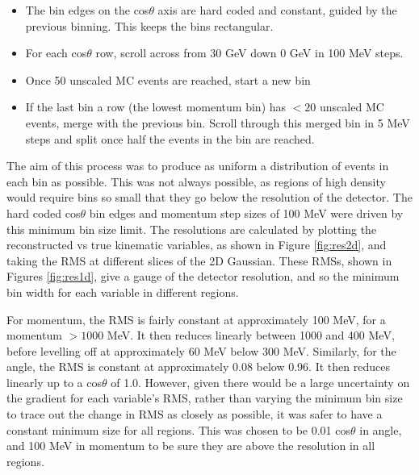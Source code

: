 \begin{itemize}

\item The bin edges on the cos$\theta$ axis are hard coded and constant, guided by the previous binning. This keeps the bins rectangular.

\item For each cos$\theta$ row, scroll across from 30 GeV down 0 GeV in 100 MeV steps.

\item Once 50 unscaled MC events are reached, start a new bin

\item If the last bin a row (the lowest momentum bin) has $<20$ unscaled MC events, merge with the previous bin. Scroll through this merged bin in 5 MeV steps and split once half the events in the bin are reached.

\end{itemize}

The aim of this process was to produce as uniform a distribution of events in each bin as possible. This was not always possible, as regions of high density would require bins so small that they go below the resolution of the detector. The hard coded cos$\theta$ bin edges and momentum step sizes of 100 MeV were driven by this minimum bin size limit. The resolutions are calculated by plotting the reconstructed vs true kinematic variables, as shown in Figure \ref{fig:res2d}, and taking the RMS at different slices of the 2D Gaussian. These RMSs, shown in Figures \ref{fig:res1d}, give a gauge of the detector resolution, and so the minimum bin width for each variable in different regions.

For momentum, the RMS is fairly constant at approximately 100 MeV, for a momentum $> 1000$ MeV. It then reduces linearly between 1000 and 400 MeV, before levelling off at approximately 60 MeV below 300 MeV. Similarly, for the angle, the RMS is constant at approximately 0.08 below 0.96. It then reduces linearly up to a cos$\theta$ of 1.0. However, given there would be a large uncertainty on the gradient for each variable's RMS, rather than varying the minimum bin size to trace out the change in RMS as closely as possible, it was safer to have a constant minimum size for all regions. This was chosen to be 0.01 cos$\theta$ in angle, and 100 MeV in momentum to be sure they are above the resolution in all regions. 

